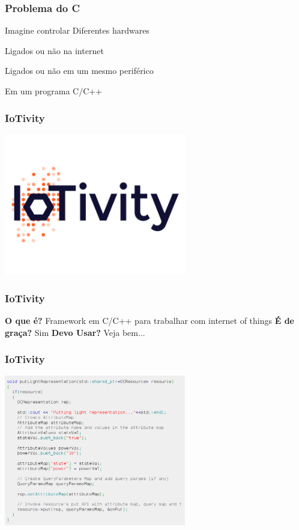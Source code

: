 \documentclass{beamer}
\begin{document}
\begin{frame} \frametitle{ Problema do C }
 Imagine controlar Diferentes hardwares

 Ligados ou não na internet

 Ligados ou não em um mesmo periférico

 Em um programa C/C++
\end{frame}

\begin{frame} \frametitle{ IoTivity }
    \includegraphics[width=300px]{images/iotivity2}
\end{frame}

\begin{frame} \frametitle { IoTivity }
 \textbf{O que é?}
\linebreak
\linebreak
 Framework em C/C++ para trabalhar com internet of things
\linebreak
\linebreak
 \textbf{É de graça?}
\linebreak
\linebreak
 Sim
\linebreak
\linebreak
 \textbf{Devo Usar?}
\linebreak
\linebreak
\pause
 Veja bem...
\end{frame}

\begin{frame} \frametitle{ IoTivity }
    \includegraphics[width=300px]{images/iotivity}
\end{frame}
\end{document}
